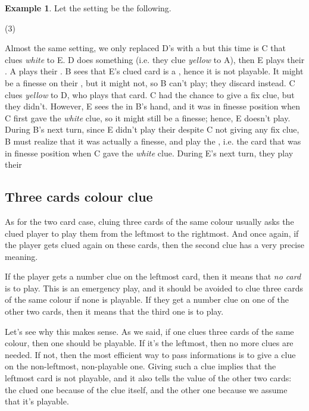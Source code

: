 \documentclass[a4paper]{article}
\theoremstyle{plain}
\theoremstyle{definition}
\newtheorem{example}[theorem]{Example}
\begin{document}
\begin{example}
	
	Let the setting be the following.
	
	\begin{tasks}(3)
		\task[+]      
		\task[A]    
		\task[B]    
		\task[C]    
		\task[D]    
		\task[E]    
	\end{tasks}
	
	Almost the same setting, we only replaced D's  with a  but this time is C that clues \textit{white} to E. D does something (i.e. they clue \textit{yellow} to A), then E plays their . A plays their . B sees that E's clued card is a , hence it is not playable. It might be a finesse on their , but it might not, so B can't play; they discard instead. C clues \textit{yellow} to D, who plays that card. C had the chance to give a fix clue, but they didn't. However, E sees the  in B's hand, and it was in finesse position when C first gave the \textit{white} clue, so it might still be a finesse; hence, E doesn't play. During B's next turn, since E didn't play their  despite C not giving any fix clue, B must realize that it was actually a finesse, and play the , i.e. the card that was in finesse position when C gave the \textit{white} clue. During E's next turn, they play their 
	
\end{example}

\subsection{Three cards colour clue}

As for the two card case, cluing three cards of the same colour usually asks the clued player to play them from the leftmost to the rightmost. And once again, if the player gets clued again on these cards, then the second clue has a very precise meaning.

If the player gets a number clue on the leftmost card, then it means that \textit{no card} is to play. This is an emergency play, and it should be avoided to clue three cards of the same colour if none is playable. If they get a number clue on one of the other two cards, then it means that the third one is to play.

Let's see why this makes sense. As we said, if one clues three cards of the same colour, then one should be playable. If it's the leftmost, then no more clues are needed. If not, then the most efficient way to pass informations is to give a clue on the non-leftmost, non-playable one. Giving such a clue implies that the leftmost card is not playable, and it also tells the value of the other two cards: the clued one because of the clue itself, and the other one because we assume that it's playable.
\end{document}
